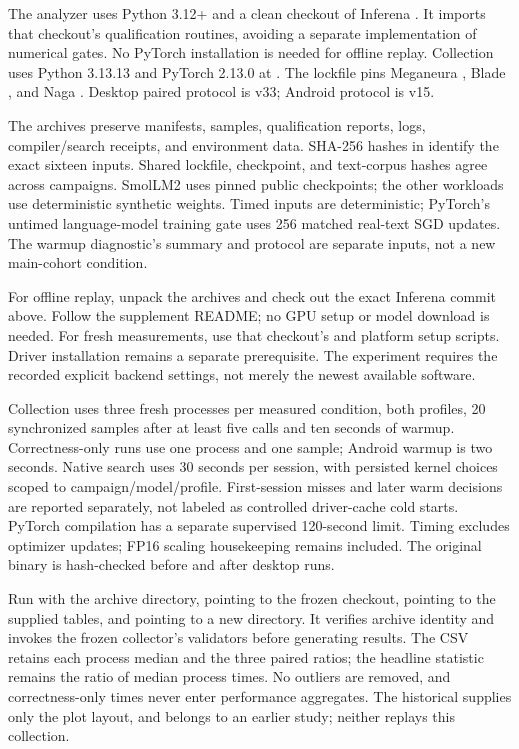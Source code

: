 The analyzer uses Python 3.12+ and a clean checkout of Inferena
. It imports that checkout's
qualification routines, avoiding a separate implementation of numerical gates.
No PyTorch installation is needed for offline replay. Collection uses Python
3.13.13 and PyTorch 2.13.0 at .
The lockfile pins Meganeura , Blade , and Naga
. Desktop paired protocol is v33; Android protocol is v15.

The archives preserve manifests, samples, qualification reports, logs,
compiler/search receipts, and environment data. SHA-256 hashes in
 identify the exact sixteen inputs. Shared lockfile,
checkpoint, and text-corpus hashes agree across campaigns. SmolLM2 uses pinned
public checkpoints; the other workloads use deterministic synthetic weights.
Timed inputs are deterministic; PyTorch's untimed language-model training gate
uses 256 matched real-text SGD updates. The warmup diagnostic's summary and
protocol are separate inputs, not a new main-cohort condition.

For offline replay, unpack the archives and check out the exact Inferena
commit above. Follow the supplement README; no GPU setup or model download
is needed. For fresh measurements, use that checkout's 
and platform setup scripts. Driver installation remains a separate
prerequisite. The experiment requires the recorded explicit backend settings,
not merely the newest available software.

\artcomp
Collection uses three fresh processes per measured condition, both profiles,
20 synchronized samples after at least five calls and ten seconds of warmup.
Correctness-only runs use one process and one sample; Android warmup is two
seconds. Native search uses 30 seconds per session, with persisted kernel
choices scoped to campaign/model/profile. First-session misses and later
warm decisions are reported separately, not labeled as controlled driver-cache
cold starts. PyTorch compilation has a separate supervised 120-second limit.
Timing excludes optimizer updates; FP16 scaling housekeeping remains included.
The original binary is hash-checked before and after desktop runs.

\artout
Run  with the archive directory, 
pointing to the frozen checkout,  pointing to the supplied
tables, and  pointing to a new directory. It verifies archive
identity and invokes the frozen collector's validators before generating
results. The CSV retains each process median and the three paired ratios;
the headline statistic remains the ratio of median process times. No outliers
are removed, and correctness-only times never enter performance aggregates.
The historical  supplies only the plot layout, and
 belongs to an earlier study; neither replays this
collection.

